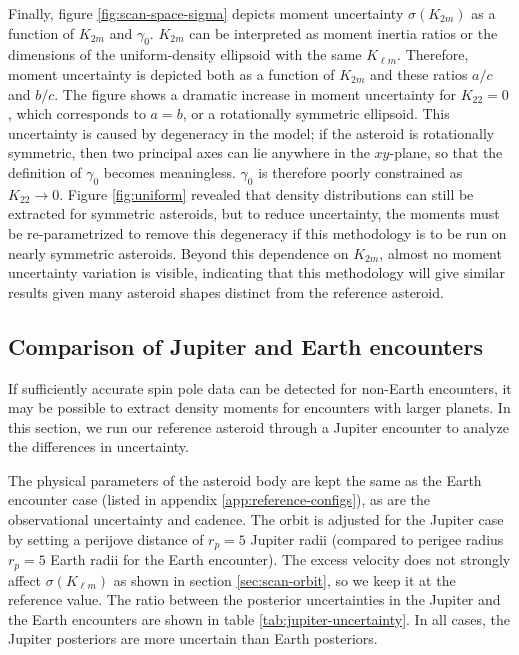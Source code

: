 \documentclass[fleqn,usenatbib]{mnras}
\begin{document}
Finally, figure \ref{fig:scan-space-sigma} depicts moment uncertainty $\sigma(K_{2m})$ as a function of $K_{2m}$ and $\gamma_0$. $K_{2m}$ can be interpreted as moment inertia ratios or the dimensions of the uniform-density ellipsoid with the same $K_{\ell m}$. Therefore, moment uncertainty is depicted both as a function of $K_{2m}$ and these ratios $a/c$ and $b/c$. The figure shows a dramatic increase in moment uncertainty for $K_{22} = 0$, which corresponds to $a=b$, or a rotationally symmetric ellipsoid. This uncertainty is caused by degeneracy in the model; if the asteroid is rotationally symmetric, then two principal axes can lie anywhere in the $xy$-plane, so that the definition of $\gamma_0$ becomes meaningless. $\gamma_0$ is therefore poorly constrained as $K_{22} \rightarrow 0$. Figure \ref{fig:uniform} revealed that density distributions can still be extracted for symmetric asteroids, but to reduce uncertainty, the moments must be re-parametrized to remove this degeneracy if this methodology is to be run on nearly symmetric asteroids. Beyond this dependence on $K_{2m}$, almost no moment uncertainty variation is visible, indicating that this methodology will give similar results given many asteroid shapes distinct from the reference asteroid.


\subsection{Comparison of Jupiter and Earth encounters}
\label{sec:jupiter-earth}

If sufficiently accurate spin pole data can be detected for non-Earth encounters, it may be possible to extract density moments for encounters with larger planets. In this section, we run our reference asteroid through a Jupiter encounter to analyze the differences in uncertainty.

The physical parameters of the asteroid body are kept the same as the Earth encounter case (listed in appendix \ref{app:reference-configs}), as are the observational uncertainty and cadence. The orbit is adjusted for the Jupiter case by setting a perijove distance of $r_p=5$ Jupiter radii (compared to perigee radius $r_p=5$ Earth radii for the Earth encounter). The excess velocity does not strongly affect $\sigma(K_{\ell m})$ as shown in section \ref{sec:scan-orbit}, so we keep it at the reference value.
The ratio between the posterior uncertainties in the Jupiter and the Earth encounters are shown in table \ref{tab:jupiter-uncertainty}. In all cases, the Jupiter posteriors are more uncertain than Earth posteriors.
\end{document}
